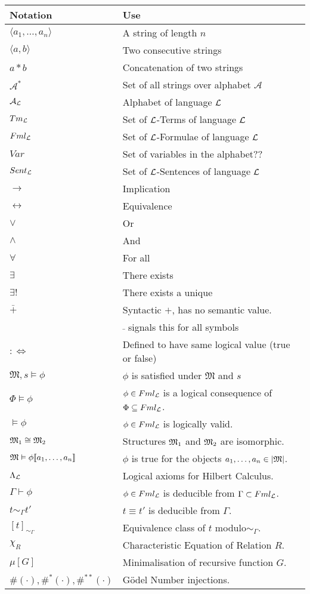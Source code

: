 \documentclass[11pt,a4paper]{article}
\begin{document}
\begin{center}\begin{tabular}{|l|l|}
\hline
\textbf{Notation}&\textbf{Use}\\
\hline$\langle a_1,\dots,a_n\rangle$&A string of length $n$\\
$\langle a,b\rangle$&Two consecutive strings\\
$a*b$&Concatenation of two strings\\
$\mathcal{A}^*$&Set of all strings over alphabet $\mathcal{A}$\\
$\mathcal{A}_{\mathcal{L}}$&Alphabet of language $\mathcal{L}$\\
$Tm_{\mathcal{L}}$&Set of $\mathcal{L}$-Terms of language $\mathcal{L}$\\
$Fml_{\mathcal{L}}$&Set of $\mathcal{L}$-Formulae of language $\mathcal{L}$\\
$Var$&Set of variables in the alphabet??\\
$Sent_{\mathcal{L}}$&Set of $\mathcal{L}$-Sentences of language $\mathcal{L}$\\
$\to$&Implication\\
$\leftrightarrow$&Equivalence\\
$\vee$& Or\\
$\wedge$&And\\
$\forall$&For all\\
$\exists$&There exists\\
$\exists!$&There exists a unique\\
$\bar+$&Syntactic $+$, has no semantic value.\\
&$\bar{ }$ signals this for all symbols\\
$:\Leftrightarrow$&Defined to have same logical value (true or false)\\
$\mathfrak{M},s\vDash\phi$&$\phi$ is satisfied under $\mathfrak{M}$ and $s$\\
$\Phi\vDash\phi$&$\phi\in Fml_{\mathcal{L}}$ is a logical consequence of $\Phi\subseteq Fml_{\mathcal{L}}$.\\
$\vDash\phi$&$\phi\in Fml_{\mathcal{L}}$ is logically valid.\\
$\mathfrak{M}_1\cong\mathfrak{M}_2$&Structures $\mathfrak{M}_1$ and $\mathfrak{M}_2$ are isomorphic.\\
$\mathfrak{M}\vDash\phi[\![a_1,\dots,a_n]\!]$&$\phi$ is true for the objects $a_1,\dots,a_n\in|\mathfrak{M}|$.\\
$\Lambda_{\mathcal{L}}$&Logical axioms for Hilbert Calculus.\\
$\Gamma\vdash\phi$&$\phi\in Fml_{\mathcal{L}}$ is deducible from $\Gamma\subset Fml_{\mathcal{L}}$.\\
$t\sim_\Gamma t'$&$t\equiv t'$ is deducible from $\Gamma$.\\
$[t]_{\sim_\Gamma}$&Equivalence class of $t$ modulo$\sim_\Gamma$.\\
$\chi_R$&Characteristic Equation of Relation $R$.\\
$\mu[G]$&Minimalisation of recursive function $G$.\\
$\#(\cdot),\#^*(\cdot),\#^{**}(\cdot)$&G\"odel Number injections.\\
\hline
\end{tabular}\end{center}
\end{document}
